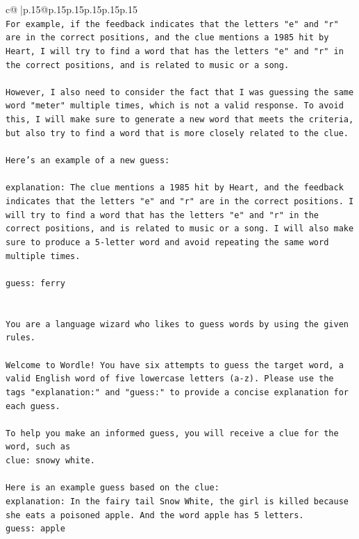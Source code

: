 \documentclass{article}
\begin{document}
{\begin{supertabular}{c@{$\;$}|p{.15\linewidth}@{}p{.15\linewidth}p{.15\linewidth}p{.15\linewidth}p{.15\linewidth}p{.15\linewidth}}
{{{\\ 
\texttt{For example, if the feedback indicates that the letters "e" and "r" are in the correct positions, and the clue mentions a 1985 hit by Heart, I will try to find a word that has the letters "e" and "r" in the correct positions, and is related to music or a song. } \\
\\ 
\texttt{However, I also need to consider the fact that I was guessing the same word "meter" multiple times, which is not a valid response. To avoid this, I will make sure to generate a new word that meets the criteria, but also try to find a word that is more closely related to the clue. } \\
\\ 
\texttt{Here's an example of a new guess:} \\
\\ 
\texttt{explanation: The clue mentions a 1985 hit by Heart, and the feedback indicates that the letters "e" and "r" are in the correct positions. I will try to find a word that has the letters "e" and "r" in the correct positions, and is related to music or a song. I will also make sure to produce a 5{-}letter word and avoid repeating the same word multiple times.} \\
\\ 
\texttt{guess: ferry} \\
\\ 
\\ 
\texttt{You are a language wizard who likes to guess words by using the given rules.} \\
\\ 
\texttt{Welcome to Wordle! You have six attempts to guess the target word, a valid English word of five lowercase letters (a{-}z). Please use the tags "explanation:" and "guess:" to provide a concise explanation for each guess.} \\
\\ 
\texttt{To help you make an informed guess, you will receive a clue for the word, such as} \\
\texttt{clue: snowy white.} \\
\\ 
\texttt{Here is an example guess based on the clue:} \\
\texttt{explanation: In the fairy tail Snow White, the girl is killed because she eats a poisoned apple. And the word apple has 5 letters.} \\
\texttt{guess: apple} \\
}}}
\end{supertabular}}
\end{document}
